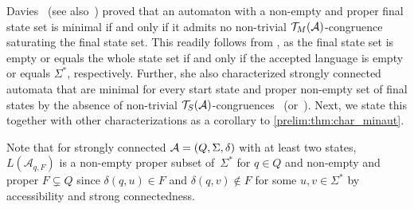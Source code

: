 Davies~\cite[Lem.~3.7]{DBLP:journals/mst/Davies18} (see also~\cite[Lem.~4.2.8]{DBLP:phd/basesearch/Davies19}) proved 
that an automaton with a non-empty and proper final state set is minimal
if and only if it admits no non-trivial $\mathcal T_M(\mathcal A)$-congruence saturating
the final state set. This readily follows 
from ,
as the final state set is empty or equals the whole state
set if and only if the accepted language is empty or equals $\Sigma^*$, respectively.
Further, she also characterized
strongly connected automata that are minimal for every start state and proper non-empty set of final states
by the absence of non-trivial $\mathcal T_S(\mathcal A)$-congruences~\cite[Prop.~4.2.3]{DBLP:journals/mst/Davies18} (or~\cite[Prop.~3.2]{DBLP:phd/basesearch/Davies19}).
Next, we state this together with other characterizations as a corollary to \cref{prelim:thm:char_minaut}.

Note that for strongly connected $\mathcal A = (Q, \Sigma, \delta)$ 
with at least two states, $L(\mathcal A_{q,F})$
is a non-empty proper subset of~$\Sigma^*$ for $q \in Q$
and non-empty and proper $F \subsetneq Q$
since $\delta(q, u) \in F$
and $\delta(q, v) \notin F$
for some $u,v \in \Sigma^*$ by accessibility and strong connectedness.

